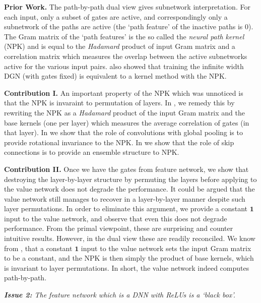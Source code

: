\textbf{Prior Work.} The path-by-path dual view gives subnetwork interpretation. For each input, only a subset of gates are active, and correspondingly only a subnetwork of the paths are active (the `path feature' of the inactive paths is $0$). The Gram matrix of the `path features' is the so called the \emph{neural path kernel} (NPK) and is equal to the \emph{Hadamard} product of input Gram matrix and a correlation matrix which measures the overlap between the active subnetworks active for the various input pairs. \cite{npk} also showed that training the infinite width DGN (with gates fixed) is equivalent to a kernel method with the NPK.

\textbf{Contribution I.} An important property of the NPK which was unnoticed is that the NPK is invaraint to permutation of layers. In , we remedy this by rewriting the NPK as a \emph{Hadamard} product of the input Gram matrix and the base kernels (one per layer) which measures the average correlation of gates (in that layer). In  we show that the role of convolutions with global pooling is to provide rotational invariance to the NPK. In  we show that the role of skip connections is to provide an ensemble structure to NPK. 

\textbf{Contribution II.} Once we have the gates from feature network, we show that destroying the layer-by-layer structure by permuting the layers before applying to the value network does not degrade the performance. It could be argued that the value network still manages to recover in a layer-by-layer manner despite such layer permutations. In order to eliminate this argument, we provide a constant $\mathbf{1}$ input to the value network, and observe that even this does not degrade performance. From the primal viewpoint, these are surprising and counter intuitive results. However, in the dual view these are readily reconciled. We know from , that a constant $\mathbf{1}$ input to the value network sets the input Gram matrix to be a constant, and the NPK is then simply the product of base kernels, which is invariant to layer permutations. In short, the value network indeed computes path-by-path.



\emph{\textbf{Issue 2:} The feature network which is a DNN with ReLUs is a `black box'.}

